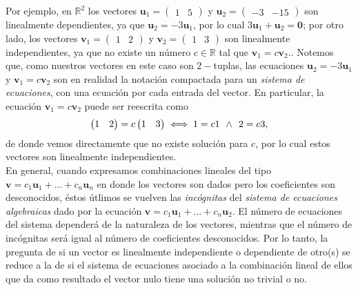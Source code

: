 \documentclass[notasLineal]{subfiles}
\begin{document}
Por ejemplo, en $\mathbb{R}^2$ los vectores $\mathbf{u}_1=\begin{pmatrix} 1 & 5 \end{pmatrix}$ y $\mathbf{u}_2=\begin{pmatrix} -3 & -15 \end{pmatrix}$ son linealmente dependientes, ya que $\mathbf{u}_2=-3\mathbf{u}_1$, por lo cual $3\mathbf{u}_1+\mathbf{u}_2=\mathbf{0}$; por otro lado, los vectores $\mathbf{v}_1=\begin{pmatrix} 1 & 2 \end{pmatrix}$ y $\mathbf{v}_2=\begin{pmatrix} 1 & 3 \end{pmatrix}$ son linealmente independientes, ya que no existe un número $c\in\mathbb{R}$ tal que $\mathbf{v}_1=c\mathbf{v}_2.$. Notemos que, como nuestros vectores en este caso son $2-$tuplas, las ecuaciones $\mathbf{u}_2=-3\mathbf{u}_1$ y $\mathbf{v}_1=c\mathbf{v}_2$ son en realidad la notación compactada para un \emph{sistema de ecuaciones}, con una ecuación por cada entrada del vector. En particular, la ecuación $\mathbf{v}_1=c\mathbf{v}_2$ puede ser reescrita como $$\begin{pmatrix} 1 & 2 \end{pmatrix}=c\begin{pmatrix} 1 & 3 \end{pmatrix}\iff 1=c1 \hspace{1.5mm} \land\hspace{1.5mm} 2=c3,$$ de donde vemos directamente que no existe solución para $c$, por lo cual estos vectores son linealmente independientes. \\

    En general, cuando expresamos combinaciones lineales del tipo $\mathbf{v}=c_1\mathbf{u}_1+...+c_n\mathbf{u}_n$ en donde los vectores son dados pero los coeficientes son desconocidos, éstos útlimos se vuelven las \emph{incógnitas} del \emph{sistema de ecuaciones algebraicas} dado por la ecuación $\mathbf{v}=c_1\mathbf{u}_1+...+c_n\mathbf{u}_2$. El número de ecuaciones del sistema dependerá de la naturaleza de los vectores, mientras que el número de incógnitas será igual al número de coeficientes desconocidos. Por lo tanto, la pregunta de si un vector es linealmente independiente o dependiente de otro(s) se reduce a la de si el sistema de ecuaciones asociado a la combinación lineal de ellos que da como resultado el vector nulo tiene una solución no trivial o no. \\
\end{document}
